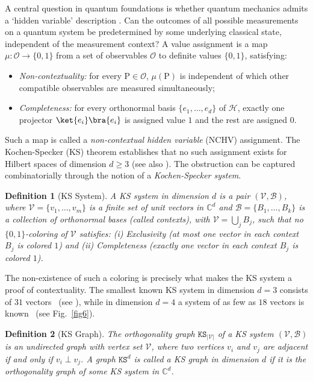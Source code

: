 \documentclass[12pt,a4paper]{article}
\newtheorem{definition}{Definition}
\begin{document}
\noindent A central question in quantum foundations is whether quantum mechanics admits a `hidden variable' description \cite{Einstein1935,Bell1964,Bell1966,Mermin1993}. Can the outcomes of all possible measurements on a quantum system be predetermined by some underlying classical state, independent of the measurement context? A value assignment is a map $\mu: \mathcal{O} \to \{0, 1\}$ from a set of observables $\mathcal{O}$ to definite values $\{0,1\}$, satisfying:
\begin{itemize}[itemsep=-0.15cm, parsep=0.15cm, topsep=2pt, leftmargin=0.4cm]
\item \emph{Non-contextuality:} for every $\mathrm{P}\in\mathcal{O}$, $\mu(\mathrm{P})$ is independent of which other compatible observables are measured simultaneously;
\item \emph{Completeness:} for every orthonormal basis $\{e_1, \ldots, e_d\}$ of $\mathcal{H}$, exactly one projector $\ket{e_i}\bra{e_i}$ is assigned value $1$ and the rest are assigned $0$.
\end{itemize}
Such a map is called a \emph{non-contextual hidden variable} (NCHV) assignment. The Kochen-Specker (KS) theorem establishes that no such assignment exists for Hilbert spaces of dimension $d \geq 3$ \cite{Kochen1967} (see also \cite{Budroni2022}). The obstruction can be captured combinatorially through the notion of a \emph{Kochen-Specker system}.

\begin{definition}[KS System]\label{def11}
A KS system in dimension $d$ is a pair $(\mathcal{V}, \mathcal{B})$, where $\mathcal{V} = \{v_1, \ldots, v_m\}$ is a finite set of unit vectors in $\mathbb{C}^d$ and $\mathcal{B} = \{B_1, \ldots, B_k\}$ is a collection of orthonormal bases (called \emph{contexts}), with $\mathcal{V} = \bigcup_j B_j$, such that no $\{0,1\}$-coloring of $\mathcal{V}$ satisfies: (i) Exclusivity (at most one vector in each context $B_j$ is colored $1$) and (ii) Completeness (exactly one vector in each context $B_j$ is colored $1$).
\end{definition}

\noindent The non-existence of such a coloring is precisely what makes the KS system a proof of contextuality. The smallest known KS system in dimension $d = 3$ consists of $31$ vectors~\cite{Peres1995} (see \cite{Kernaghan2026}), while in dimension $d = 4$ a system of as few as $18$ vectors is known~\cite{Cabello1996} (see Fig.~\ref{fig6}).

\begin{definition}[KS Graph]\label{def12}
The \emph{orthogonality graph} $\mathtt{KS}_{|\mathcal{V}|}$ of a KS system $(\mathcal{V}, \mathcal{B})$ is an undirected graph with vertex set $\mathcal{V}$, where two vertices $v_i$ and $v_j$ are adjacent if and only if $v_i \perp v_j$. A graph $\mathtt{KS}^d$ is called a KS graph in dimension $d$ if it is the orthogonality graph of some KS system in $\mathbb{C}^d$.
\end{definition}
\end{document}
